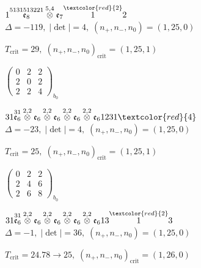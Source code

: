 \documentclass[10pt]{article}
\begin{document}
\smallskip

$1\overset{5131513221}{\mathfrak{e}_8}\overset{5,4}{\otimes}\mathfrak{e}_7\overset{\textcolor{red}{2}}{1}2$ \quad $\Delta=-119,\; |\det|=4,\; (n_+,n_-,n_0)=(1,25,0)$

\hspace{1em}$T_{\text{crit}}=29,\; (n_+,n_-,n_0)_{\text{crit}}=(1,25,1)$

\hspace{2em}$\left(\begin{smallmatrix}0 & 2 & 2 \\ 2 & 0 & 2 \\ 2 & 2 & 4\end{smallmatrix}\right)_{\!b_0}$

\smallskip

$31\overset{31}{\mathfrak{e}_6}\overset{2,2}{\otimes}\mathfrak{e}_6\overset{2,2}{\otimes}\mathfrak{e}_6\overset{2,2}{\otimes}\mathfrak{e}_6\overset{2,2}{\otimes}\mathfrak{e}_61231\textcolor{red}{4}$ \quad $\Delta=-23,\; |\det|=4,\; (n_+,n_-,n_0)=(1,25,0)$

\hspace{1em}$T_{\text{crit}}=25,\; (n_+,n_-,n_0)_{\text{crit}}=(1,25,1)$

\hspace{2em}$\left(\begin{smallmatrix}0 & 2 & 2 \\ 2 & 4 & 6 \\ 2 & 6 & 8\end{smallmatrix}\right)_{\!b_0}$

\smallskip

$31\overset{31}{\mathfrak{e}_6}\overset{2,2}{\otimes}\mathfrak{e}_6\overset{2,2}{\otimes}\mathfrak{e}_6\overset{2,2}{\otimes}\mathfrak{e}_6\overset{2,2}{\otimes}\mathfrak{e}_613\overset{\textcolor{red}{2}}{1}3$ \quad $\Delta=-1,\; |\det|=36,\; (n_+,n_-,n_0)=(1,25,0)$

\hspace{1em}$T_{\text{crit}}=24.78 \to 25,\; (n_+,n_-,n_0)_{\text{crit}}=(1,26,0)$
\end{document}
